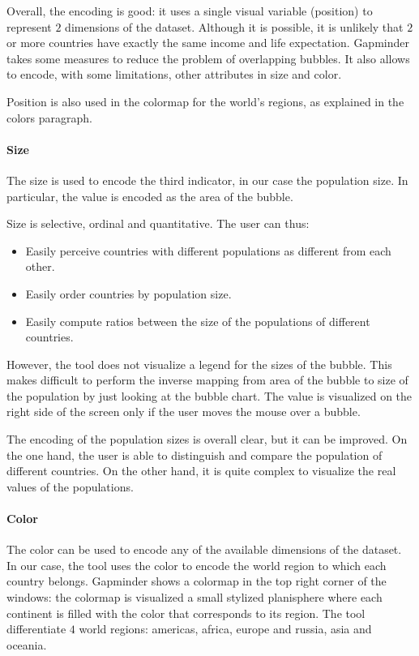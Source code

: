 Overall, the encoding is good:
it uses a single visual variable (position) to represent $2$ dimensions of the dataset.
Although it is possible, it is unlikely that $2$ or more countries have exactly the same income and life expectation.
Gapminder takes some measures to reduce the problem of overlapping bubbles.
It also allows to encode, with some limitations, other attributes in size and color.

Position is also used in the colormap for the world's regions, as explained in the colors paragraph.


\paragraph{Size}
The size is used to encode the third indicator, in our case the population size.
In particular, the value is encoded as the area of the bubble.

Size is selective, ordinal and quantitative.
The user can thus:
\begin{itemize}
    \item Easily perceive countries with different populations as different from each other.
    \item Easily order countries by population size.
    \item Easily compute ratios between the size of the populations of different countries.
\end{itemize}

However, the tool does not visualize a legend for the sizes of the bubble.
This makes difficult to perform the inverse mapping from area of the bubble to size of the population by just looking at the bubble chart.
The value is visualized on the right side of the screen only if the user moves the mouse over a bubble.

The encoding of the population sizes is overall clear, but it can be improved.
On the one hand, the user is able to distinguish and compare the population of different countries.
On the other hand, it is quite complex to visualize the real values of the populations.

\paragraph{Color}
\label{paragraph:bubbles-color}
The color can be used to encode any of the available dimensions of the dataset.
In our case, the tool uses the color to encode the world region to which each country belongs.
Gapminder shows a colormap in the top right corner of the windows:
the colormap is visualized a small stylized planisphere where each continent is filled with the color that corresponds to its region.
The tool differentiate $4$ world regions: americas, africa, europe and russia, asia and oceania.

